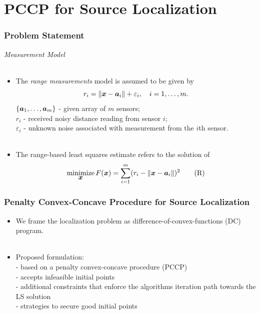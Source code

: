 \documentclass [t] {beamer} %
\begin{document}
\section[Chapter 3]{PCCP for Source Localization}


\begin{frame} %
\frametitle{Problem Statement }
{\large \textit{Measurement Model}} \\~\\
\normalsize
\begin{itemize}
\item
The \textit{range measurements} model is assumed to be given by
\begin{equation} 
\nonumber
r_i = \|{\mbox{\boldmath$x$}} - {\mbox{\boldmath$a$}}_i\| + \varepsilon_i, \quad i = 1, \ldots , m.
\end{equation}  
$\{\mbox{\boldmath$a$}_1,\ldots, \mbox{\boldmath$a$}_m\}$ - given array of $m$ sensors;\\
$r_i$ - received noisy distance reading from sensor $i$; \\
$\varepsilon_i$ - unknown noise associated with measurement from the $i$th sensor. \\ ~\\

\item
The range-based least squares  estimate refers to the solution of%
\begin{equation} \label{R-LS} 
\mathop{\mbox{minimize}}_{\mbox{\boldmath$x$}} F(\mbox{\boldmath$x$})=\sum_{i=1}^{m} (r_i - \|{\mbox{\boldmath$x$}} - {\mbox{\boldmath$a$}}_i\|)^2	\tag{R}
\end{equation}
\end{itemize}
\end{frame}

\begin{frame} %
\frametitle{Penalty Convex-Concave  Procedure for Source Localization}
\phantom{m}
\begin{itemize}
\item
We frame the localization problem as difference-of-convex-functions
(DC) program.
\\~\\
\item
Proposed formulation:\\
- based on a penalty convex-concave procedure (PCCP)\\
- accepts infeasible initial points\\
- additional constraints that enforce the algorithms iteration path towards the LS solution\\
- strategies to secure good initial points
\end{itemize}
\end{frame}
\end{document}
